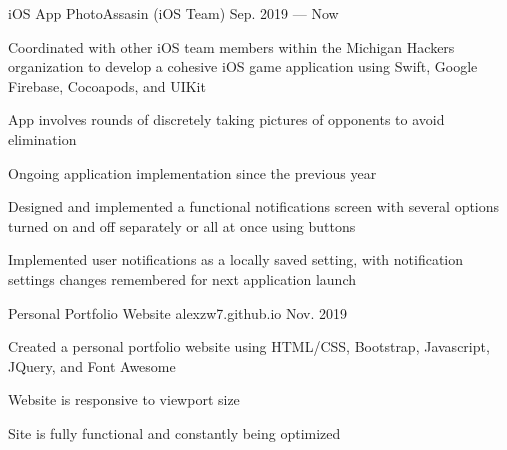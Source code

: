 

\begin{cventries}

  \cventry
    {iOS App}
    {PhotoAssasin (iOS Team)}
    {Sep. 2019 — Now}
    {}
    {
      \begin{cvitems} %
        \item {Coordinated with other iOS team members within the Michigan Hackers organization to develop a cohesive iOS game application
        using Swift, Google Firebase, Cocoapods, and UIKit}
        \item {App involves rounds of discretely taking pictures of opponents to avoid elimination}
        \item {Ongoing application implementation since the previous year}
        \item {Designed and implemented a functional notifications screen with several options turned on and off separately or all at once using buttons}
        \item {Implemented user notifications as a locally saved setting, with notification settings changes remembered for next application launch}
      \end{cvitems}
    }

  \cventry
    {Personal Portfolio Website}
    {alexzw7.github.io}
    {Nov. 2019}
    {}
    {
      \begin{cvitems} %
        \item {Created a personal portfolio website using HTML/CSS, Bootstrap, Javascript, JQuery, and Font Awesome}
        \item {Website is responsive to viewport size}
        \item {Site is fully functional and constantly being optimized}
      \end{cvitems}
    }


\end{cventries}
